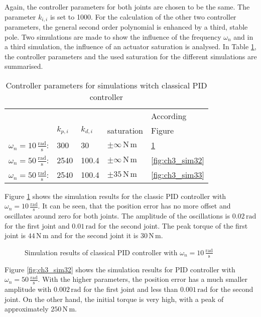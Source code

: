 Again, the controller parameters for both joints are chosen to be the same. The parameter $k_{i,i}$ is set to 1000. For the calculation of the other two controller parameters, the general second order polynomial is enhanced by a third, stable pole. Two simulations are made to show the influence of the frequency $\omega_n$ and in a third simulation, the influence of an actuator saturation is analysed. In Table \ref{tab:ch3_pid}, the controller parameters and the used saturation for the different simulations are summarised.
\begin{table}[H]
	\begin{center}
		\caption{Controller parameters for simulations witch classical PID controller}
		\label{tab:ch3_pid}
		\begin{tabular}{lllll}
			& & & & According \\
			& $k_{p,i}$ & $k_{d,i}$ & saturation & Figure \\
			\midrule
			$\omega_n = 10\,\mathrm{\frac{rad}{s}}$: & 300 & 30 & $\pm\infty\,\mathrm{N\,m}$ & \ref{fig:ch3_sim31} \\
			$\omega_n = 50\,\mathrm{\frac{rad}{s}}$: & 2540 & 100.4 & $\pm\infty\,\mathrm{N\,m}$ & \ref{fig:ch3_sim32} \\
			$\omega_n = 50\,\mathrm{\frac{rad}{s}}$: & 2540 & 100.4 & $\pm 35\,\mathrm{N\,m}$ &  \ref{fig:ch3_sim33}\\
			\bottomrule
		\end{tabular}
	\end{center}
\end{table}
Figure \ref{fig:ch3_sim31} shows the simulation results for the classic PID controller with $\omega_n = 10\,\mathrm{\frac{rad}{s}}$. It can be seen, that the position error has no more offset and oscillates around zero for both joints. The amplitude of the oscillations is $0.02\,\mathrm{rad}$ for the first joint and $0.01\,\mathrm{rad}$ for the second joint. The peak torque of the first joint is $44\,\mathrm{N\,m}$ and for the second joint it is $30\,\mathrm{N\,m}$.
\begin{figure}[H]
	\centering
	
	\caption{Simulation results of classical PID controller with $\omega_n = 10\,\mathrm{\frac{rad}{s}}$}
	\label{fig:ch3_sim31}
\end{figure}
Figure \ref{fig:ch3_sim32} shows the simulation results for PID controller with $\omega_n = 50\,\mathrm{\frac{rad}{s}}$. With the higher parameters, the position error has a much smaller amplitude with $0.002\,\mathrm{rad}$ for the first joint and less than $0.001\,\mathrm{rad}$ for the second joint. On the other hand, the initial torque is very high, with a peak of approximately $250\,\mathrm{N\,m}$.\\
